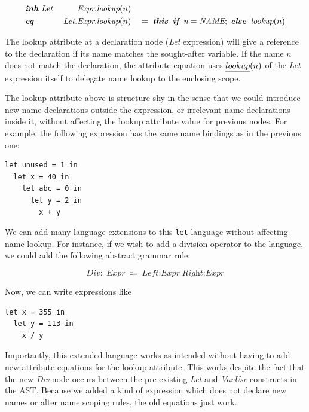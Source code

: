 \documentclass[10pt, twoside, openright]{book}
\begin{document}
\begin{alignat*}{3}
& \textbf{\textit{inh}} \; \textit{Let} & \; \textit{Expr}.&\textit{lookup}(n) && \\
& \textbf{\textit{eq}} & \; \textit{Let.Expr}.&\textit{lookup}(n) &&=
  \; \textit{\textbf{this}} \;\; \textit{\textbf{if}} \;\; \textit{n} = \textit{NAME}; \;
  \textit{\textbf{else}} \;\; \textit{lookup}(n)
\end{alignat*}

The lookup attribute at a declaration node (\emph{Let} expression) will give a reference to the
declaration if its name matches the sought-after variable. If the name $n$ does not match the
declaration, the attribute equation uses $\emph{lookup}(n)$ of the \emph{Let} expression itself
to delegate name lookup to the enclosing scope.

The lookup attribute above is structure-shy in the sense that we could introduce new name
declarations outside the expression, or irrelevant name declarations inside it, without
affecting the lookup attribute value for previous nodes.
For example, the following expression has the same name bindings as in the previous one:

\begin{lstlisting}
let unused = 1 in
  let x = 40 in
    let abc = 0 in
      let y = 2 in
        x + y
\end{lstlisting}

We can add many language extensions to this \verb'let'-language without affecting
name lookup. For instance, if we wish to add a division operator to the language, we could
add the following abstract grammar rule:

\begin{equation*}
\textit{Div} : \; \textit{Expr} \; \Coloneqq \; \textit{Left:Expr} \; \textit{Right:Expr}
\end{equation*}

\noindent
Now, we can write expressions like

\begin{lstlisting}
let x = 355 in
  let y = 113 in
    x / y
\end{lstlisting}

\noindent
Importantly, this extended language works as intended without having to add new attribute
equations for the lookup attribute. This works despite the fact that the new
\emph{Div} node occurs between the pre-existing \emph{Let} and \emph{VarUse}
constructs in the AST.
Because we added a kind of expression which does not declare
new names or alter name scoping rules, the old equations just work.
\end{document}
